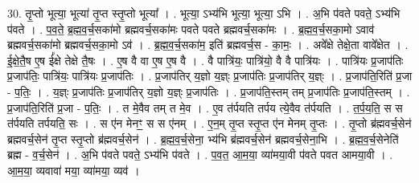 \documentclass[17pt]{extarticle}
\begin{document}
30. तृ॒प्तो भूत्या॒ भूत्या॑ तृ॒प्त स्तृ॒प्तो भूत्या᳚ । . भूत्या॒ ऽभ्य॑भि भूत्या॒ भूत्या॒ ऽभि । . अ॒भि प॑वते पवते॒ ऽभ्य॑भि प॑वते । . प॒व॒ते॒ ब्र॒ह्म॒व॒र्च॒सका॑मो ब्रह्मवर्च॒सका॑मः पवते पवते ब्रह्मवर्च॒सका॑मः । . ब्र॒ह्म॒व॒र्च॒सका॒मो ऽवाव॑ ब्रह्मवर्च॒सका॑मो ब्रह्मवर्च॒सका॒मो ऽव॑ । . ब्र॒ह्म॒व॒र्च॒सका॑म॒ इति॑ ब्रह्मवर्च॒स - का॒मः॒ । . अवे᳚क्षे तेक्षे॒ता वावे᳚क्षेत । . ई॒क्षे॒तै॒ष ए॒ष ई᳚क्षे तेक्षे तै॒षः । . ए॒ष वै वा ए॒ष ए॒ष वै । . वै पात्रि॑यः॒ पात्रि॑यो॒ वै वै पात्रि॑यः । . पात्रि॑यः प्र॒जाप॑तिः प्र॒जाप॑तिः॒ पात्रि॑यः॒ पात्रि॑यः प्र॒जाप॑तिः । . प्र॒जाप॑तिर् य॒ज्ञो य॒ज्ञ्ः प्र॒जाप॑तिः प्र॒जाप॑तिर् य॒ज्ञ्ः । . प्र॒जाप॑ति॒रिति॑ प्र॒जा - प॒तिः॒ । . य॒ज्ञ्ः प्र॒जाप॑तिः प्र॒जाप॑तिर् य॒ज्ञो य॒ज्ञ्ः प्र॒जाप॑तिः । . प्र॒जाप॑ति॒स्तम् तम् प्र॒जाप॑तिः प्र॒जाप॑ति॒स्तम् । . प्र॒जाप॑ति॒रिति॑ प्र॒जा - प॒तिः॒ । . त मे॒वैव तम् त मे॒व । . ए॒व त॑र्पयति तर्पय त्ये॒वैव त॑र्पयति । . त॒र्प॒य॒ति॒ स स त॑र्पयति तर्पयति॒ सः । . स ए॑न मेनꣳ॒॒ स स ए॑नम् । . ए॒न॒म् तृ॒प्त स्तृ॒प्त ए॑न मेनम् तृ॒प्तः । . तृ॒प्तो ब्र॑ह्मवर्च॒सेन॑ ब्रह्मवर्च॒सेन॑ तृ॒प्त स्तृ॒प्तो ब्र॑ह्मवर्च॒सेन॑ । . ब्र॒ह्म॒व॒र्च॒सेना॒ भ्य॑भि ब्र॑ह्मवर्च॒सेन॑ ब्रह्मवर्च॒सेना॒भि । . ब्र॒ह्म॒व॒र्च॒सेनेति॑ ब्रह्म - व॒र्च॒सेन॑ । . अ॒भि प॑वते पवते॒ ऽभ्य॑भि प॑वते । . प॒व॒त॒ आ॒म॒या॒ व्या॑मया॒वी प॑वते पवत आमया॒वी । . आ॒म॒या॒ व्यवावा॑ मया॒ व्या॑मया॒ व्यव॑ । \newline
\end{document}
